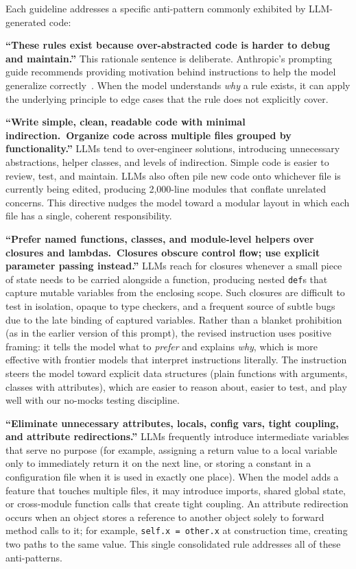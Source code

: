 \documentclass{article}
\begin{document}
\noindent Each guideline addresses a specific anti-pattern commonly
exhibited by LLM-generated code:

\textbf{``These rules exist because over-abstracted code is harder to debug and maintain.''}  This rationale sentence is deliberate.  Anthropic's prompting guide recommends providing motivation behind instructions to help the model generalize correctly~\citep{anthropic2025prompting}.  When the model understands \emph{why} a rule exists, it can apply the underlying principle to edge cases that the rule does not explicitly cover.

\textbf{``Write simple, clean, readable code with minimal indirection.\ Organize code across multiple files grouped by functionality.''}  LLMs tend to over-engineer solutions, introducing unnecessary abstractions, helper classes, and levels of indirection.  Simple code is easier to review, test, and maintain.  LLMs also often pile new code onto whichever file is currently being edited, producing 2,000-line modules that conflate unrelated concerns.  This directive nudges the model toward a modular layout in which each file has a single, coherent responsibility.

\textbf{``Prefer named functions, classes, and module-level helpers over closures and lambdas.\ Closures obscure control flow; use explicit parameter passing instead.''}  LLMs reach for closures whenever a small piece of state needs to be carried alongside a function, producing nested \texttt{def}s that capture mutable variables from the enclosing scope.  Such closures are difficult to test in isolation, opaque to type checkers, and a frequent source of subtle bugs due to the late binding of captured variables.  Rather than a blanket prohibition (as in the earlier version of this prompt), the revised instruction uses positive framing: it tells the model what to \emph{prefer} and explains \emph{why}, which is more effective with frontier models that interpret instructions literally.  The instruction steers the model toward explicit data structures (plain functions with arguments, classes with attributes), which are easier to reason about, easier to test, and play well with our no-mocks testing discipline.

\textbf{``Eliminate unnecessary attributes, locals, config vars, tight coupling, and attribute redirections.''}  LLMs frequently introduce intermediate variables that serve no purpose (for example, assigning a return value to a local variable only to immediately return it on the next line, or storing a constant in a configuration file when it is used in exactly one place).  When the model adds a feature that touches multiple files, it may introduce imports, shared global state, or cross-module function calls that create tight coupling.  An attribute redirection occurs when an object stores a reference to another object solely to forward method calls to it; for example, \texttt{self.x = other.x} at construction time, creating two paths to the same value.  This single consolidated rule addresses all of these anti-patterns.
\end{document}
